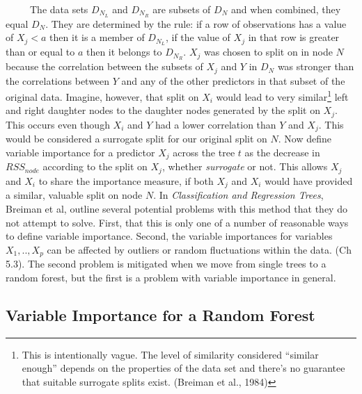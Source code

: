 \documentclass[12pt,twoside]{reedthesis}
\begin{document}
  ~~~~~The data sets \(D_{N_L}\) and \(D_{N_R}\) are subsets of \(D_N\)
  and when combined, they equal \(D_N\). They are determined by the rule:
  if a row of observations has a value of \(X_j < a\) then it is a member
  of \(D_{N_L}\), if the value of \(X_j\) in that row is greater than or
  equal to \(a\) then it belongs to \(D_{N_R}\). \(X_j\) was chosen to
  split on in node \(N\) because the correlation between the subsets of
  \(X_j\) and \(Y\) in \(D_N\) was stronger than the correlations between
  \(Y\) and any of the other predictors in that subset of the original
  data. Imagine, however, that split on \(X_i\) would lead to very
  similar\footnote{This is intentionally vague. The level of similarity
    considered ``similar enough'' depends on the properties of the data
    set and there's no guarantee that suitable surrogate splits exist.
    (Breiman et al., 1984)} left and right daughter nodes to the daughter
  nodes generated by the split on \(X_j\). This occurs even though \(X_i\)
  and \(Y\) had a lower correlation than \(Y\) and \(X_j\). This would be
  considered a surrogate split for our original split on \(N\). Now define
  variable importance for a predictor \(X_j\) across the tree \(t\) as the
  decrease in \(RSS_{node}\) according to the split on \(X_j\), whether
  \emph{surrogate} or not. This allows \(X_j\) and \(X_i\) to share the
  importance measure, if both \(X_j\) and \(X_i\) would have provided a
  similar, valuable split on node \(N\). In \emph{Classification and
  Regression Trees}, Breiman et al, outline several potential problems
  with this method that they do not attempt to solve. First, that this is
  only one of a number of reasonable ways to define variable importance.
  Second, the variable importances for variables \(X_1,..,X_p\) can be
  affected by outliers or random fluctuations within the data. (Ch 5.3).
  The second problem is mitigated when we move from single trees to a
  random forest, but the first is a problem with variable importance in
  general.
  
  \subsection{Variable Importance for a Random
  Forest}\label{variable-importance-for-a-random-forest}
  
\end{document}
